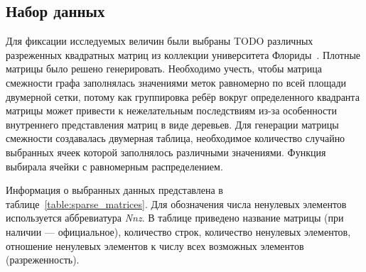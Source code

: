 \subsection{Набор данных}
Для фиксации исследуемых величин были выбраны TODO различных разреженных квадратных матриц из коллекции университета Флориды~\cite{matrixData}.
Плотные матрицы было решено генерировать. Необходимо учесть, чтобы матрица смежности графа заполнялась значениями меток равномерно по всей площади двумерной сетки, потому как группировка ребёр вокруг определенного квадранта матрицы может привести к нежелательным последствиям из-за особенности внутреннего представления матриц в виде деревьев. Для генерации матрицы смежности создавалась двумерная таблица, необходимое количество случайно выбранных ячеек которой заполнялось различными значениями. Функция выбирала ячейки с равномерным распределением.

Информация о выбранных данных представлена в таблице~\ref{table:sparse_matrices}. 
Для обозначения числа ненулевых элементов используется аббревиатура \textit{Nnz}. В таблице приведено название матрицы (при наличии --- официальное), количество строк, количество ненулевых элементов, отношение ненулевых элементов к числу всех возможных элементов (разреженность).

\begin{table}[h]
\begin{center}
\caption{Разреженные матричные данные}
\label{table:sparse_matrices}
\end{center}
\end{table}


